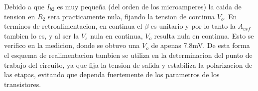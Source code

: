 \documentclass[11pt,a4paper]{article}
\begin{document}
Debido a que \(I_{b2}\) es muy pequeña (del orden de los microamperes) la caida de tension en \(R_2\) sera practicamente nula, fijando la tension de continua \(V_o\). En terminos de retroalimentacion, en continua el \(\beta\) es unitario y por lo tanto la \(A_{vsf}\) tambien lo es, y al ser la \(V_s\) nula en continua, \(V_o\) resulta nula en continua. Esto se verifico en la medicion, donde se obtuvo una \(V_o\) de apenas 7.8mV. De esta forma el esquema de realimentacion tambien se utiliza en la determinacion del punto de trabajo del circuito, ya que fija la tension de salida y estabiliza la polarizacion de las etapas, evitando que dependa fuertemente de los parametros de los transistores.


\normalem
\end{document}
